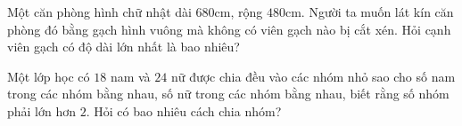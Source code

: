 \begin{vd}%
	Một căn phòng hình chữ nhật dài $680$cm, rộng $480$cm. Người ta muốn lát kín căn phòng đó bằng gạch hình vuông mà không có viên gạch nào bị cắt xén. Hỏi cạnh viên gạch có độ dài lớn nhất là bao nhiêu?
\end{vd}
\begin{vd}%
	Một lớp học có $18$ nam và $24$ nữ được chia đều vào các nhóm nhỏ sao cho số nam trong các nhóm bằng nhau, số nữ trong các nhóm bằng nhau, biết rằng số nhóm phải lớn hơn $2$. Hỏi có bao nhiêu cách chia nhóm?
\end{vd}
